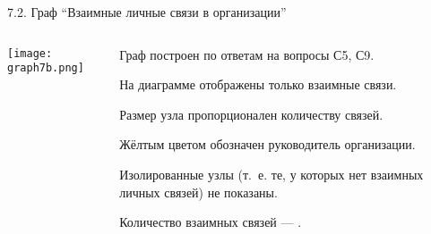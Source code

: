 \begin{frame}{7.2. Граф ``Взаимные личные связи в организации''}

\begin{columns}
\begin{column}{0.75\textwidth} 
\centering
          \texttt{[image: graph7b.png]}
\end{column}
\begin{column}{0.25\textwidth} 
\tiny
Граф построен по ответам на вопросы С5, С9.
\smallskip

На диаграмме отображены только взаимные связи.
\smallskip

Размер узла пропорционален количеству связей.
\smallskip

Жёлтым цветом обозначен руководитель организации.
\smallskip

Изолированные узлы (т.~е. те, у которых нет взаимных личных связей) не показаны.
\bigskip

Количество взаимных связей --- \valGBlinks.

\end{column}
\end{columns}
\end{frame}


